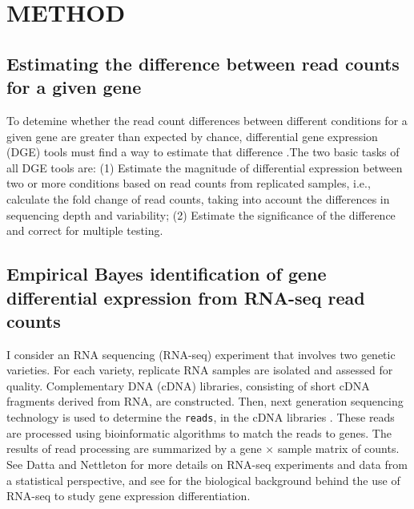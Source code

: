 \documentclass[11pt]{isuthesis}
\begin{document}


\tableofcontents
{} \cleardoublepage {}
{}
\listoftables
\cleardoublepage {} {}
\listoffigures



\cleardoublepage {}  
\cleardoublepage {}         



\newpage
{}




\chapter{METHOD}

\section{Estimating the difference between read counts for a given gene}

To detemine whether the read count differences between different conditions for a given gene are greater than expected by chance, differential gene expression (DGE) tools must find a way to estimate that difference \citep{dundar2015introduction}.The two basic tasks of all DGE tools are: (1) Estimate the magnitude of differential expression between two or more conditions based on read counts from replicated samples, i.e., calculate the fold change of read counts, taking into account the differences in sequencing depth and variability; (2) Estimate the significance of the difference and correct for multiple testing. 

\section{Empirical Bayes identification of gene differential expression from RNA-seq read counts}

I consider an RNA sequencing (RNA-seq) experiment that involves two genetic varieties. For each variety, replicate RNA samples are isolated and assessed for quality. Complementary DNA (cDNA) libraries, consisting of short cDNA fragments derived from RNA, are constructed. Then, next generation sequencing technology is used to determine the {\tt reads}, in the cDNA libraries \citep{niemi2015empirical}. These reads are processed using bioinformatic algorithms to match the reads to genes. The results of read processing are summarized by a gene $\times$ sample matrix of counts. See Datta and Nettleton \citep{datta2014statistical} for more details on RNA-seq experiments and data from a statistical perspective, and see \citep{paschold2012complementation} for the biological background behind the use of RNA-seq to study gene expression differentiation. 
\end{document}
